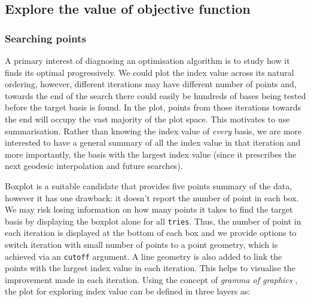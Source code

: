 \documentclass[12pt]{article}
\begin{document}
\hypertarget{static}{%
\subsection{Explore the value of objective function}\label{static}}

\hypertarget{searching-points}{%
\subsubsection{Searching points}\label{searching-points}}

A primary interest of diagnosing an optimisation algorithm is to study
how it finds its optimal progressively. We could plot the index value
across its natural ordering, however, different iterations may have
different number of points and, towards the end of the search there
could easily be hundreds of bases being tested before the target basis
is found. In the plot, points from those iterations towards the end will
occupy the vast majority of the plot space. This motivates to use
summarisation. Rather than knowing the index value of \emph{every}
basis, we are more interested to have a general summary of all the index
value in that iteration and more importantly, the basis with the largest
index value (since it prescribes the next geodesic interpolation and
future searches).

Boxplot is a suitable candidate that provides five points summary of the
data, however it has one drawback: it doesn't report the number of point
in each box. We may risk losing information on how many points it takes
to find the target basis by displaying the boxplot alone for all
\texttt{tries}. Thus, the number of point in each iteration is displayed
at the bottom of each box and we provide options to switch iteration
with small number of points to a point geometry, which is achieved via
an \texttt{cutoff} argument. A line geometry is also added to link the
points with the largest index value in each iteration. This helps to
visualise the improvement made in each iteration. Using the concept of
\emph{gramma of graphics} \citep{wickham2010layered}, the plot for
exploring index value can be defined in three layers as:
\end{document}
